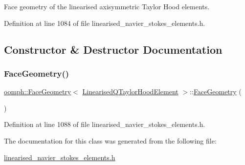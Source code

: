 Face geometry of the linearised axisymmetric Taylor Hood elements. 

Definition at line 1084 of file linearised\+\_\+navier\+\_\+stokes\+\_\+elements.\+h.



\subsection{Constructor \& Destructor Documentation}
\mbox{\label{classoomph_1_1FaceGeometry_3_01LinearisedQTaylorHoodElement_01_4_a9093144b0ed1d343a95921e75a1faa46}} 
\subsubsection{\texorpdfstring{Face\+Geometry()}{FaceGeometry()}}
{\footnotesize\ttfamily \hyperlink{classoomph_1_1FaceGeometry}{oomph\+::\+Face\+Geometry}$<$ \hyperlink{classoomph_1_1LinearisedQTaylorHoodElement}{Linearised\+Q\+Taylor\+Hood\+Element} $>$\+::\hyperlink{classoomph_1_1FaceGeometry}{Face\+Geometry} (\begin{DoxyParamCaption}{ }\end{DoxyParamCaption})\hspace{0.3cm}{\ttfamily [inline]}}



Definition at line 1088 of file linearised\+\_\+navier\+\_\+stokes\+\_\+elements.\+h.



The documentation for this class was generated from the following file\+:\begin{DoxyCompactItemize}
\item 
\hyperlink{linearised__navier__stokes__elements_8h}{linearised\+\_\+navier\+\_\+stokes\+\_\+elements.\+h}\end{DoxyCompactItemize}
